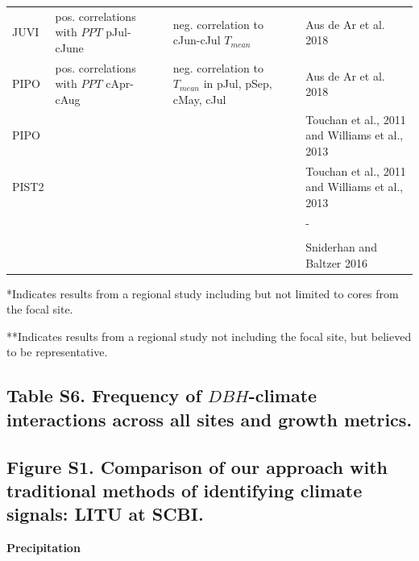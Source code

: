 \documentclass[
]{article}
\begin{document}
\begin{longtable}{l>{\raggedright\arraybackslash}p{2.5cm}>{\raggedright\arraybackslash}p{2.5cm}>{\raggedright\arraybackslash}p{2.5cm}>{\raggedright\arraybackslash}p{2.5cm}>{\raggedright\arraybackslash}p{2cm}}
\hspace{1em}JUVI & pos. correlations with $PPT$ pJul-cJune &  & neg. correlation to cJun-cJul $T_{mean}$ &  & Aus de Ar et al. 2018\\
\hspace{1em}PIPO & pos. correlations with $PPT$ cApr-cAug &  & neg. correlation to $T_{mean}$ in pJul, pSep, cMay, cJul &  & Aus de Ar et al. 2018\\
PIPO &  &  &  &  & Touchan et al., 2011 and Williams et al., 2013\\
PIST2 &  &  &  &  & Touchan et al., 2011 and Williams et al., 2013\\
 &  &  &  &  & -\\
 &  &  &  &  & \\
 &  &  &  &  & Sniderhan and Baltzer 2016\\
\bottomrule
\end{longtable}
\endgroup{}

*Indicates results from a regional study including but not limited to
cores from the focal site.

**Indicates results from a regional study not including the focal site,
but believed to be representative.

\newpage

\hypertarget{table-s6.-frequency-of-dbh-climate-interactions-across-all-sites-and-growth-metrics.}{%
\subsection{\texorpdfstring{Table S6. Frequency of \(DBH\)-climate
interactions across all sites and growth
metrics.}{Table S6. Frequency of DBH-climate interactions across all sites and growth metrics.}}\label{table-s6.-frequency-of-dbh-climate-interactions-across-all-sites-and-growth-metrics.}}

\newpage

\hypertarget{figure-s1.-comparison-of-our-approach-with-traditional-methods-of-identifying-climate-signals-litu-at-scbi.}{%
\subsection{Figure S1. Comparison of our approach with traditional
methods of identifying climate signals: LITU at
SCBI.}\label{figure-s1.-comparison-of-our-approach-with-traditional-methods-of-identifying-climate-signals-litu-at-scbi.}}

\textbf{Precipitation}
\end{document}
